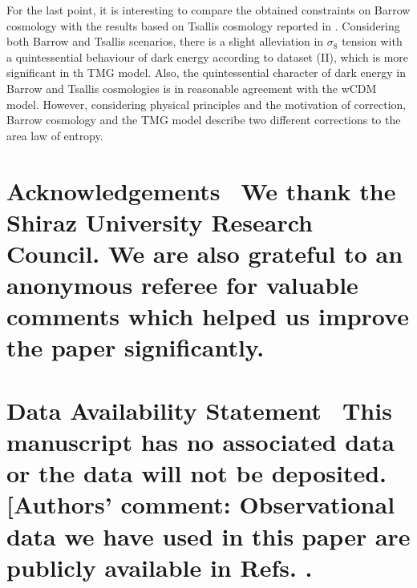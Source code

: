 \documentclass[11pt,twocolumn]{article}
\begin{document}
For the last point, it is interesting to compare the obtained
constraints on Barrow cosmology with the results based on Tsallis
cosmology reported in \cite{ts12}. Considering both Barrow and
Tsallis scenarios, there is a slight alleviation in $\sigma_8$
tension with a quintessential behaviour of dark energy according
to dataset (II), which is more significant in th TMG model. Also, 
the quintessential character of dark energy in Barrow and Tsallis 
cosmologies is in reasonable agreement with the wCDM model.
However, considering physical principles and the
motivation of correction, Barrow cosmology and the TMG model
describe two different corrections to the area law of
entropy.
\section*{\fontsize{9}{9}\selectfont Acknowledgements
\, {\normalfont We thank the Shiraz University Research Council. We are also grateful to an anonymous 
referee for valuable comments which helped us improve the paper significantly.}}
\section*{\fontsize{9}{9}\selectfont Data Availability Statement \, {\normalfont This manuscript has no associated data or the data
        will not be deposited. [Authors' comment: Observational data we have used in this paper are publicly available in Refs. \cite{p18,sz1,sz2,lens1,lens2,pan,bao1,bao2,rsd1,rsd2}.}}


\end{document}
